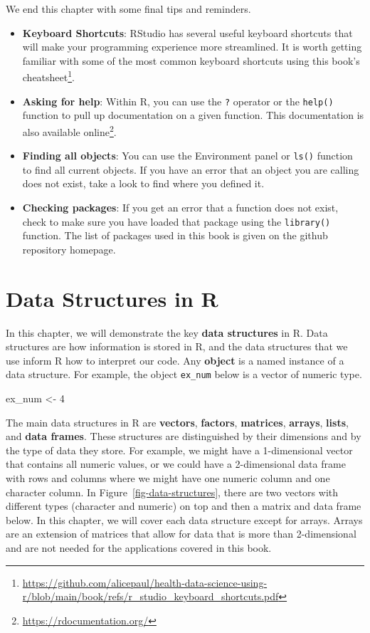 \documentclass[
  letterpaper,
]{krantz}
\makeatletter
\newenvironment{Shaded}{\begin{snugshade}}{\end{snugshade}}
\newcommand{\DecValTok}[1]{\textcolor[rgb]{0.68,0.00,0.00}{#1}}
\newcommand{\NormalTok}[1]{\textcolor[rgb]{0.00,0.23,0.31}{#1}}
\newcommand{\OtherTok}[1]{\textcolor[rgb]{0.00,0.23,0.31}{#1}}
\renewcommand{\href}[2]{#2\footnote{\url{#1}}}
\newenvironment{kframe}{%
\medskip{}
\setlength{\fboxsep}{.8em}
 \def\at@end@of@kframe{}%
 \ifinner\ifhmode%
  \def\at@end@of@kframe{\end{minipage}}%
  \begin{minipage}{\columnwidth}%
 \fi\fi%
 \def\FrameCommand##1{\hskip\@totalleftmargin \hskip-\fboxsep
 \colorbox{shadecolor}{##1}\hskip-\fboxsep
     \hskip-\linewidth \hskip-\@totalleftmargin \hskip\columnwidth}%
 \MakeFramed {\advance\hsize-\width
   \@totalleftmargin\z@ \linewidth\hsize
   \@setminipage}}%
 {\par\unskip\endMakeFramed%
 \at@end@of@kframe}
\renewenvironment{Shaded}{\begin{kframe}}{\end{kframe}}
\makeatother
\begin{document}
We end this chapter with some final tips and reminders.

\begin{itemize}
\item
  \textbf{Keyboard Shortcuts}: RStudio has several useful keyboard
  shortcuts that will make your programming experience more streamlined.
  It is worth getting familiar with some of the most common keyboard
  shortcuts using this book's
  \href{https://github.com/alicepaul/health-data-science-using-r/blob/main/book/refs/r_studio_keyboard_shortcuts.pdf}{cheatsheet}.
\item
  \textbf{Asking for help}: Within R, you can use the \texttt{?}
  operator or the \texttt{help()} function to pull up documentation on a
  given function. This documentation is also available
  \href{https://rdocumentation.org/}{online}.
\item
  \textbf{Finding all objects}: You can use the Environment panel or
  \texttt{ls()} function to find all current objects. If you have an
  error that an object you are calling does not exist, take a look to
  find where you defined it.
\item
  \textbf{Checking packages}: If you get an error that a function does
  not exist, check to make sure you have loaded that package using the
  \texttt{library()} function. The list of packages used in this book is
  given on the github repository homepage.
\end{itemize}

\chapter{Data Structures in R}\label{sec-data-structures}

In this chapter, we will demonstrate the key \textbf{data structures} in
R. Data structures are how information is stored in R, and the data
structures that we use inform R how to interpret our code. Any
\textbf{object} is a named instance of a data structure. For example,
the object \texttt{ex\_num} below is a vector of numeric type.

\begin{Shaded}
\begin{Highlighting}[]
\NormalTok{ex\_num }\OtherTok{\textless{}{-}} \DecValTok{4}
\end{Highlighting}
\end{Shaded}

The main data structures in R are \textbf{vectors}, \textbf{factors},
\textbf{matrices}, \textbf{arrays}, \textbf{lists}, and \textbf{data
frames}. These structures are distinguished by their dimensions and by
the type of data they store. For example, we might have a 1-dimensional
vector that contains all numeric values, or we could have a
2-dimensional data frame with rows and columns where we might have one
numeric column and one character column. In
Figure~\ref{fig-data-structures}, there are two vectors with different
types (character and numeric) on top and then a matrix and data frame
below. In this chapter, we will cover each data structure except for
arrays. Arrays are an extension of matrices that allow for data that is
more than 2-dimensional and are not needed for the applications covered
in this book.
\end{document}
